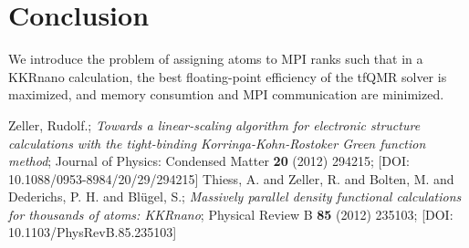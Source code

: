 \documentclass[a4paper]{article}
\newcommand{\MPIrank}{MPI rank} %
\begin{document}
\section{Conclusion}

We introduce the problem of assigning atoms to \MPIrank{}s
such that in a KKRnano calculation, 
the best floating-point efficiency of the tfQMR solver is maximized, and
memory consumtion and MPI communication are minimized.



\begin{thebibliography}{10}
 Zeller, Rudolf.;
   \textit{Towards a linear-scaling algorithm for electronic structure calculations with the tight-binding Korringa-Kohn-Rostoker {Green} function method};
    Journal of Physics: Condensed Matter \textbf{20} (2012) 294215;
    [DOI: 10.1088/0953-8984/20/29/294215]
 Thiess, A. and Zeller, R. and Bolten, M. and Dederichs, P. H. and Bl{\"u}gel, S.;
   \textit{Massively parallel density functional calculations for thousands of atoms: {KKRnano}};
    Physical Review B \textbf{85} (2012) 235103;
    [DOI: 10.1103/PhysRevB.85.235103]
\end{thebibliography}
\end{document}
